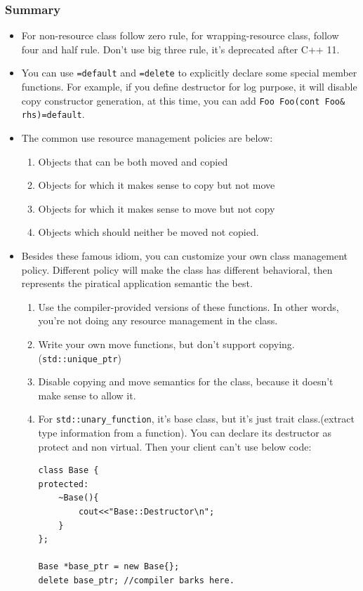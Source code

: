 \documentclass[a4paper,11pt,twoside]{book}
\begin{document}
\subsubsection{Summary}
\begin{itemize}
    \item For non-resource class follow zero rule, for wrapping-resource class, follow four and half rule. Don't use big three rule, it's deprecated after C++ 11.

    \item You can use \texttt{=default} and \texttt{=delete} to explicitly declare some special member functions. For example, if you define destructor for log purpose, it will disable copy constructor generation, at this time, you can add \texttt{Foo Foo(cont Foo\& rhs)=default}.
        
    \item The common use resource management policies are below:

\begin{enumerate}
    \item Objects that can be both moved and copied
        \item Objects for which it makes sense to copy but not move
        \item Objects for which it makes sense to move but not copy
        \item Objects which should neither be moved not copied.
\end{enumerate}

	\item Besides these famous idiom, you can customize your own class management policy. Different policy will make the class has different behavioral, then represents the piratical application semantic the best. 
	
	\begin{enumerate}
		\item Use the compiler-provided versions of these functions. In other words, you're not doing any resource management in the class.
		
		\item Write your own move functions, but don't support copying.(\texttt{std::unique\_ptr})
		
		\item Disable copying and move semantics for the class, because it doesn't make sense to allow it.
		
		\item For \texttt{std::unary\_function}, it's base class, but it's just trait class.(extract type information from a function). You can declare its destructor as protect and non virtual. Then your client can't use below code:
\begin{lstlisting}[numbers=none]
class Base {
protected:
	~Base(){
		cout<<"Base::Destructor\n";
	}
};

Base *base_ptr = new Base{};
delete base_ptr; //compiler barks here.
\end{lstlisting}
	\end{enumerate}

\end{itemize}
\end{document}
